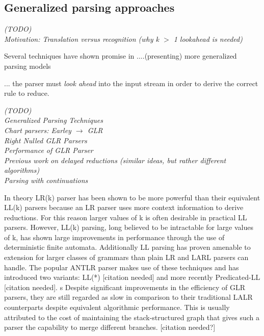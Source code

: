 \documentclass[a4paper,11pt]{article}
\begin{document}
\subsection{Generalized parsing approaches}


\emph{(TODO)\\ %
Motivation: Translation versus recognition (why k $>$ 1 lookahead is needed) \cite{Parr95lland}}

Several techniques have shown promise in ....(presenting) more generalized parsing models


... the parser must \emph{look ahead} into the input stream in order to derive the correct rule to reduce.

\emph{(TODO)\\ %
Generalized Parsing Techniques \cite{Thurston07}\\
Chart parsers: Earley $\rightarrow$ GLR \\
Right Nulled GLR Parsers \cite{1146810}\\
Performance of GLR Parser \cite{Mcpeak04elkhound:a}\\ %
Previous work on delayed reductions (similar ideas, but rather different algorithms) \cite{1287949, Marc80, 991520, 146993}\\
Parsing with continuations
}


In theory LR(k) parser has been shown to be more powerful than their equivalent LL(k) parsers because an LR parser uses more context information to derive reductions.
For this reason larger values of k is often desirable in practical LL parsers.
However, LL(k) parsing, long believed to be intractable for large values of k, has shown large improvements in performance through the use of deterministic finite automata. 
Additionally LL parsing has proven amenable to extension for larger classes of grammars than plain LR and LARL parsers can handle.
The popular ANTLR parser makes use of these techniques and has introduced two variants: LL(*) [citation needed]\cite{} and more recently Predicated-LL \cite{} [citation needed].
s
Despite significant improvements in the efficiency of GLR parsers, they are still regarded as slow in comparison to their traditional LALR counterparts despite equivalent algorithmic performance.
This is usually attributed to the cost of maintaining the stack-structured graph that gives such a parser the capability to merge different branches. [citation needed?]
\end{document}
